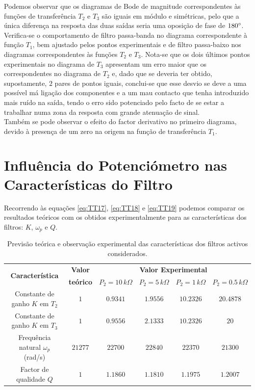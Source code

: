 \documentclass[a4paper,11pt]{report}
\begin{document}
Podemos observar que os diagramas de Bode de magnitude correspondentes às funções de transferência $T_2$ e $T_3$ são iguais em módulo e simétricas, pelo que a única diferença na resposta das duas saídas seria uma oposição de fase de $180\degree$.\\
Verifica-se o comportamento de filtro passa-banda no diagrama correspondente à função $T_1$, bem ajustado pelos pontos experimentais e de filtro passa-baixo nos diagramas correspondentes às funções $T_2$ e $T_3$. Nota-se que os dois últimos pontos experimentais no diagrama de $T_3$ apresentam um erro maior que os correspondentes no diagrama de $T_2$ e, dado que se deveria ter obtido, supostamente, $2$ pares de pontos iguais, conclui-se que esse desvio se deve a uma possível má ligação dos componentes e a um mau contacto que tenha introduzido mais ruído na saída, tendo o erro sido potenciado pelo facto de se estar a trabalhar numa zona da resposta com grande atenuação de sinal.\\
Também se pode observar o efeito do factor derivativo no primeiro diagrama, devido à presença de um zero na origem na função de transferência $T_1$. 

\section{Influência do Potenciómetro nas Características do Filtro}

Recorrendo às equações \ref{eq:TT17}, \ref{eq:TT18} e \ref{eq:TT19} podemos comparar os resultados teóricos com os obtidos experimentalmente para as características dos filtros: $K$, $\omega_p$ e $Q$.

\begin{table}[h]
\centering
\label{tab:TTP2variavel}
\begin{tabular}{||c|c|cccc||}
\hline
\multirow{2}{*}{\textbf{Característica}} & \textbf{Valor}   & \multicolumn{4}{c||}{\textbf{Valor Experimental}}                                 \\ \cline{3-6} 
                          & \textbf{teórico} & $P_2=10\, k\Omega$ & $P_2=5\, k\Omega$ & $P_2=1\, k\Omega$ & $P_2=0.5\, k\Omega$ \\ \hline \hline 
Constante de ganho $K$ em $T_2$          & $1$              & $0.9341$           & $1.9556$          & $10.2326$         & $20.4878$           \\ \hline
Constante de ganho $K$ em $T_3$          & $1$              & $0.9556$           & $2.1333$          & $10.2326$         & $20$                \\ \hline
Frequência natural $\omega_p$ (rad/s)    & $21277$          & $22700$            & $22840$           & $22370$           & $21300$             \\ \hline
Factor de qualidade $Q$                  & $1$              & $1.1860$           & $1.1810$          & $1.1975$          & $1.2007$            \\ \hline
\end{tabular}
\caption {Previsão teórica e observação experimental das características dos filtros activos considerados.}
\end{table}
\end{document}
